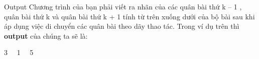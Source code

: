 Output
Chương trình của bạn phải viết ra nhãn của các quân bài thứ k – 1 , quân bài thứ k và quân bài thứ k + 1 tính từ trên xuống dưới của bộ bài sau khi áp dụng việc di chuyển các quân bài theo dãy thao tác. Trong ví dụ trên thì \textbf{output} của chúng ta sẽ là:

3   1   5